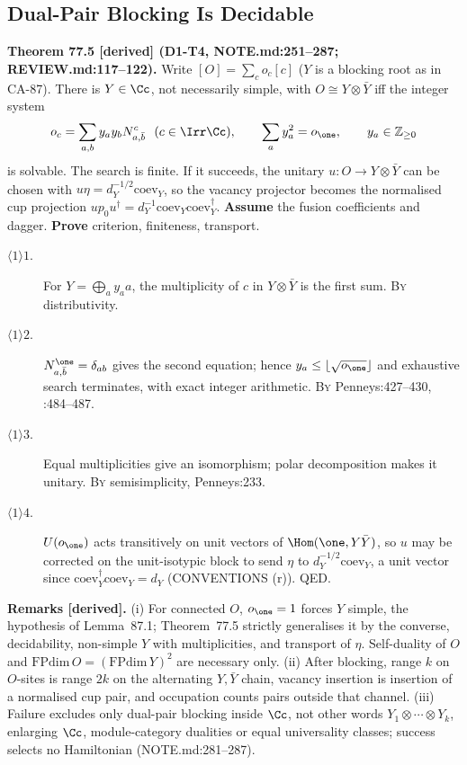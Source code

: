 \subsection{Dual-Pair Blocking Is Decidable}

\textbf{Theorem 77.5 [derived] (D1-T4, NOTE.md:251--287; REVIEW.md:117--122).}
Write \([O]=\sum_co_c[c]\) (\(Y\) is a blocking root as in CA-87).  There is \(Y\in\Cc\), not necessarily simple, with \(O\cong Y\otimes\bar Y\)
iff the integer system
\[
  o_c=\sum_{a,b}y_ay_bN^c_{a,\bar b}\ \ (c\in\Irr\Cc),\qquad
  \sum_ay_a^2=o_\one,\qquad y_a\in\mathbb Z_{\ge0}
\]
is solvable.  The search is finite.  If it succeeds, the unitary
\(u:O\to Y\otimes\bar Y\) can be chosen with
\(u\eta=d_Y^{-1/2}\mathrm{coev}_Y\), so the vacancy projector becomes the
normalised cup projection \(u p_0u^\dagger=d_Y^{-1}\mathrm{coev}_Y\mathrm{coev}_Y^\dagger\).
\textbf{Assume} the fusion coefficients and dagger. \textbf{Prove} criterion, finiteness, transport.
\begin{description}
\item[$\langle1\rangle1$.] For \(Y=\bigoplus_ay_aa\), the multiplicity of \(c\)
in \(Y\otimes\bar Y\) is the first sum. \textsc{By} distributivity.
\item[$\langle1\rangle2$.] \(N^\one_{a,\bar b}=\delta_{ab}\) gives the second
equation; hence \(y_a\le\lfloor\sqrt{o_\one}\rfloor\) and exhaustive search
terminates, with exact integer arithmetic. \textsc{By} Penneys:427--430, :484--487.
\item[$\langle1\rangle3$.] Equal multiplicities give an isomorphism; polar
decomposition makes it unitary. \textsc{By} semisimplicity, Penneys:233.
\item[$\langle1\rangle4$.] \(U(o_\one)\) acts transitively on unit vectors of
\(\Hom(\one,Y\bar Y)\), so \(u\) may be corrected on the unit-isotypic block to send
\(\eta\) to \(d_Y^{-1/2}\mathrm{coev}_Y\), a unit vector since
\(\mathrm{coev}_Y^\dagger\mathrm{coev}_Y=d_Y\) (CONVENTIONS (r)). QED.
\end{description}
\textbf{Remarks [derived].}  (i) For connected \(O\), \(o_\one=1\) forces \(Y\)
simple, the hypothesis of Lemma~87.1; Theorem~77.5 strictly generalises it by the
converse, decidability, non-simple \(Y\) with multiplicities, and transport of
\(\eta\).  Self-duality of \(O\) and \(\mathrm{FPdim}\,O=(\mathrm{FPdim}\,Y)^2\)
are necessary only.  (ii) After blocking, range \(k\) on \(O\)-sites is range
\(2k\) on the alternating \(Y,\bar Y\) chain, vacancy insertion is insertion of a
normalised cup pair, and occupation counts pairs outside that channel.  (iii)
Failure excludes only dual-pair blocking inside \(\Cc\), not other words
\(Y_1\otimes\cdots\otimes Y_k\), enlarging \(\Cc\), module-category dualities or
equal universality classes; success selects no Hamiltonian (NOTE.md:281--287).

